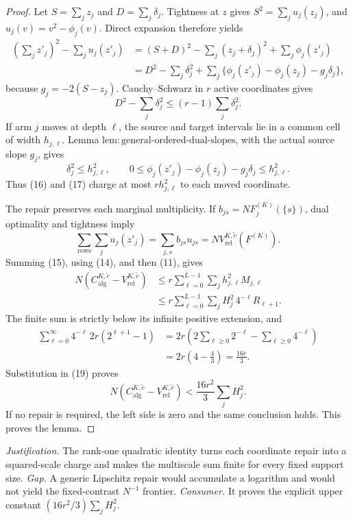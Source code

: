\documentclass{article}
\begin{document}
\begin{proof}
Let \(S=\sum_jz_j\) and \(D=\sum_j\delta_j\).  Tightness at \(z\) gives \(S^2=\sum_ju_j(z_j)\), and \(u_j(v)=v^2-\phi_j(v)\).  Direct expansion therefore yields
\[
\begin{aligned}
 \left(\sum_jz'_j\right)^2-\sum_ju_j(z'_j)
 &= (S+D)^2-\sum_j(z_j+\delta_j)^2+\sum_j\phi_j(z'_j)\\
 &=D^2-\sum_j\delta_j^2
 +\sum_j\{\phi_j(z'_j)-\phi_j(z_j)-g_j\delta_j\},
\end{aligned} \tag{15}
\]
because \(g_j=-2(S-z_j)\).  Cauchy--Schwarz in \(r\) active coordinates gives
\[
 D^2-\sum_j\delta_j^2\le(r-1)\sum_j\delta_j^2. \tag{16}
\]
If arm \(j\) moves at depth \(\ell\), the source and target intervals lie in a common cell of width \(h_{j,\ell}\).  Lemma \(\mathrm{lem{:}general\mbox{-}ordered\mbox{-}dual\mbox{-}slopes}\), with the actual source slope \(g_j\), gives
\[
 \delta_j^2\le h_{j,\ell}^2,\qquad
 0\le\phi_j(z'_j)-\phi_j(z_j)-g_j\delta_j\le h_{j,\ell}^2. \tag{17}
\]
Thus (16) and (17) charge at most \(r h_{j,\ell}^2\) to each moved coordinate.

The repair preserves each marginal multiplicity.  If \(b_{js}=NF_j^{(K)}(\{s\})\), dual optimality and tightness imply
\[
 \sum_{\mathrm{rows}}\sum_ju_j(z'_j)
 =\sum_{j,s}b_{js}u_{js}
 =N V_{\mathrm{rel}}^{K,\widetilde c}(F^{(K)}). \tag{18}
\]
Summing (15), using (14), and then (11), gives
\[
\begin{aligned}
 N(C_{\mathrm{alg}}^{K,\widetilde c}-V_{\mathrm{rel}}^{K,\widetilde c})
 &\le r\sum_{\ell=0}^{L-1}\sum_jh_{j,\ell}^2M_{j,\ell}\\
 &\le r\sum_{\ell=0}^{L-1}\sum_jH_j^2\,4^{-\ell}R_{\ell+1}.
\end{aligned} \tag{19}
\]
The finite sum is strictly below its infinite positive extension, and
\[
\begin{aligned}
 \sum_{\ell=0}^{\infty}4^{-\ell}\,2r(2^{\ell+1}-1)
 &=2r\left(2\sum_{\ell\ge0}2^{-\ell}-\sum_{\ell\ge0}4^{-\ell}\right)\\
 &=2r\left(4-\frac43\right)=\frac{16r}{3}.
\end{aligned} \tag{20}
\]
Substitution in (19) proves
\[
 N(C_{\mathrm{alg}}^{K,\widetilde c}-V_{\mathrm{rel}}^{K,\widetilde c})
 <\frac{16r^2}{3}\sum_jH_j^2.
\]
If no repair is required, the left side is zero and the same conclusion holds.  This proves the lemma.
\end{proof}
\par\smallskip\noindent \textit{Justification.} The rank-one quadratic identity turns each coordinate repair into a squared-scale charge and makes the multiscale sum finite for every fixed support size. \textit{Gap.} A generic Lipschitz repair would accumulate a logarithm and would not yield the fixed-contrast \(N^{-1}\) frontier. \textit{Consumer.} It proves the explicit upper constant \((16r^2/3)\sum_jH_j^2\).
\end{document}
